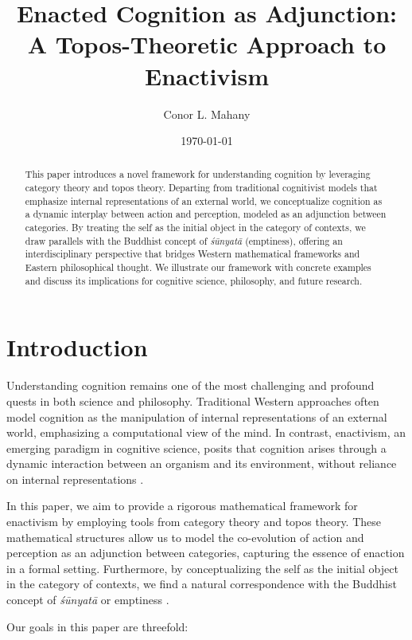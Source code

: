 \documentclass{article}
\title{Enacted Cognition as Adjunction: A Topos-Theoretic Approach to Enactivism}
\author{Conor L. Mahany}
\date{\today}
\begin{document}
\maketitle

\begin{abstract} 
This paper introduces a novel framework for understanding cognition by leveraging category theory and topos theory. Departing from traditional cognitivist models that emphasize internal representations of an external world, we conceptualize cognition as a dynamic interplay between action and perception, modeled as an adjunction between categories. By treating the self as the initial object in the category of contexts, we draw parallels with the Buddhist concept of \emph{śūnyatā} (emptiness), offering an interdisciplinary perspective that bridges Western mathematical frameworks and Eastern philosophical thought. We illustrate our framework with concrete examples and discuss its implications for cognitive science, philosophy, and future research. 
\end{abstract}

\tableofcontents

\section{Introduction}

Understanding cognition remains one of the most challenging and profound quests in both science and philosophy. Traditional Western approaches often model cognition as the manipulation of internal representations of an external world, emphasizing a computational view of the mind. In contrast, enactivism, an emerging paradigm in cognitive science, posits that cognition arises through a dynamic interaction between an organism and its environment, without reliance on internal representations \cite{varela1991}.

In this paper, we aim to provide a rigorous mathematical framework for enactivism by employing tools from category theory and topos theory. These mathematical structures allow us to model the co-evolution of action and perception as an adjunction between categories, capturing the essence of enaction in a formal setting. Furthermore, by conceptualizing the self as the initial object in the category of contexts, we find a natural correspondence with the Buddhist concept of \emph{śūnyatā} or emptiness \cite{garfield1995}.

Our goals in this paper are threefold:
\end{document}
